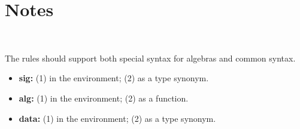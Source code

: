 \documentclass[a4paper]{article}
\begin{document}





\section{Notes}

~

The rules should support both special syntax for algebras and common syntax.
\begin{itemize}
\item \textbf{sig:} (1) in the environment; (2) as a type synonym.
\item \textbf{alg:} (1) in the environment; (2) as a function.
\item \textbf{data:} (1) in the environment; (2) as a type synonym.
\end{itemize}
\end{document}
